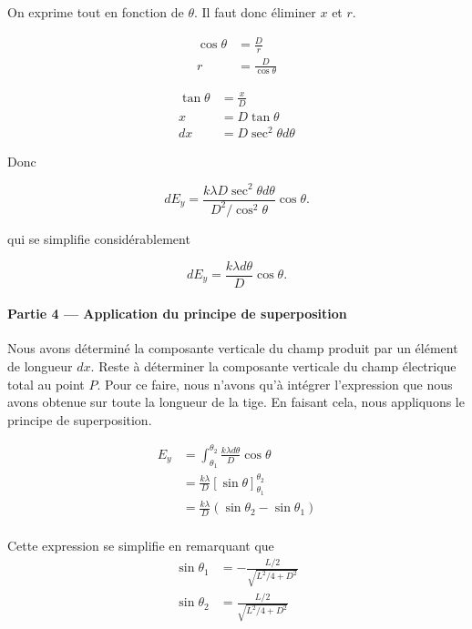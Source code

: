 On exprime tout en fonction de $\theta$. Il faut donc éliminer $x$ et $r$.

\begin{align*}
  \cos \theta &= \frac{D}{r} \\
           r  &= \frac{D}{\cos\theta}
\end{align*}

\begin{align*}
  \tan \theta &= \frac{x}{D} \\
           x  &= D\tan\theta \\
          dx  &= D\sec^2\theta d\theta
\end{align*}

Donc

  $$d E_y = \frac{k \lambda D\sec^2\theta d\theta}{D^2 / \cos^2\theta} \cos\theta.$$

qui se simplifie considérablement

  $$d E_y = \frac{k \lambda d\theta}{D} \cos\theta.$$



\paragraph{Partie 4 --- Application du principe de superposition}

Nous avons déterminé la composante verticale du champ produit par un élément de
longueur $dx$. Reste à déterminer la composante verticale du champ électrique
total au point $P$. Pour ce faire, nous n'avons qu'à intégrer l'expression que
nous avons obtenue sur toute la longueur de la tige. En faisant cela, nous
appliquons le principe de superposition.

\begin{align*}
  E_y &= \int_{\theta_1}^{\theta_2} \frac{k \lambda d\theta}{D} \cos\theta \\
      &= \frac{k \lambda}{D} \left[\sin\theta\right]_{\theta_1}^{\theta_2} \\
      &= \frac{k \lambda}{D} \left(\sin \theta_2 - \sin \theta_1 \right) \\
\end{align*}

Cette expression se simplifie en remarquant que
\begin{align*}
  \sin \theta_1 &= -\frac{L/2}{\sqrt{L^2/4 + D^2}} \\
  \sin \theta_2 &= \frac{L/2}{\sqrt{L^2/4 + D^2}} \\
\end{align*}


